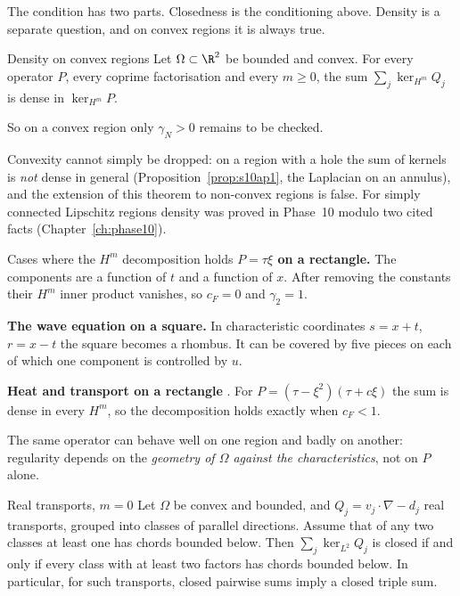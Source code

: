 The condition has two parts. Closedness is the conditioning above. Density is a separate question, and on convex regions it is always true.

\begin{theorem}{Density on convex regions  }\label{thm:density}
Let $\Omega\subset\R^2$ be bounded and convex. For every operator $P$, every coprime factorisation and every $m\ge0$, the sum $\sum_j\ker_{H^m}Q_j$ is dense in $\ker_{H^m}P$.

\end{theorem}

So on a convex region only $\gamma_N>0$ remains to be checked.

\begin{caution}[title=Added in the complete edition (Phase 10)]
Convexity cannot simply be dropped: on a region with a hole the sum of kernels is \emph{not} dense in general (Proposition~\ref{prop:s10ap1}, the Laplacian on an annulus), and the extension of this theorem to non-convex regions is false. For simply connected Lipschitz regions density was proved in Phase~10 modulo two cited facts (Chapter~\ref{ch:phase10}).
\end{caution}

\begin{example}{Cases where the $H^m$ decomposition holds  \proved}
\textbf{$P=\tau\xi$ on a rectangle.} The components are a function of $t$ and a function of $x$. After removing the constants their $H^m$ inner product vanishes, so $c_F=0$ and $\gamma_2=1$.

\textbf{The wave equation on a square.} In characteristic coordinates $s=x+t$, $r=x-t$ the square becomes a rhombus. It can be covered by five pieces on each of which one component is controlled by $u$.

\textbf{Heat and transport on a rectangle}  \pw. For $P=(\tau-\xi^2)(\tau+c\xi)$ the sum is dense in every $H^m$, so the decomposition holds exactly when $c_F<1$.

The same operator can behave well on one region and badly on another: regularity depends on the \emph{geometry of $\Omega$ against the characteristics}, not on $P$ alone.

\end{example}

\begin{proposition}{Real transports, $m=0$  \pw}\label{prop:transports}
Let $\Omega$ be convex and bounded, and $Q_j=v_j\cdot\nabla-d_j$ real transports, grouped into classes of parallel directions. Assume that of any two classes at least one has chords bounded below. Then $\sum_j\ker_{L^2}Q_j$ is closed if and only if every class with at least two factors has chords bounded below. In particular, for such transports, closed pairwise sums imply a closed triple sum.

\end{proposition}

